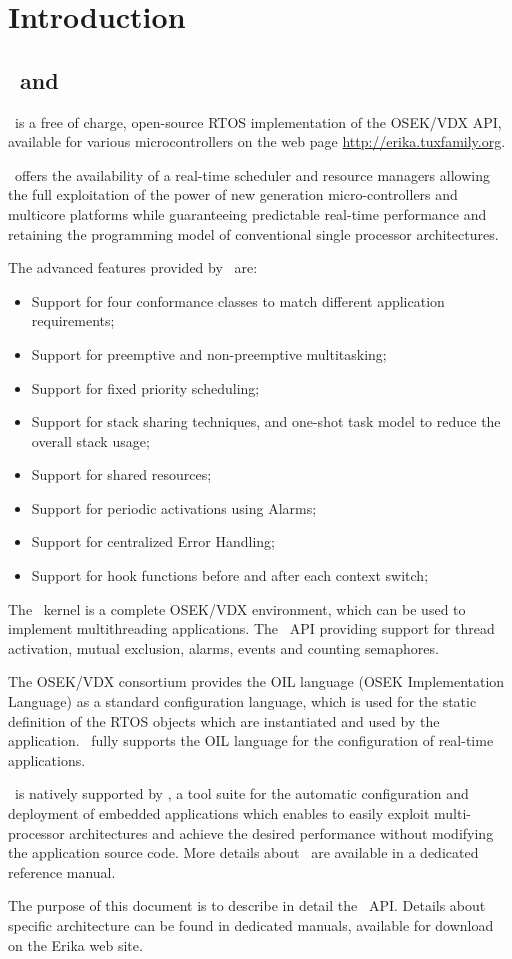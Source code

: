 \chapter{Introduction}

\section{\ee\ and \rtd}

\ee\ is a free of charge, open-source RTOS implementation of the
OSEK/VDX API, available for various microcontrollers on the web page
\url{http://erika.tuxfamily.org}.

\ee\ offers the availability of a real-time scheduler and resource 
managers allowing the full exploitation of the power of new generation 
micro-controllers and multicore platforms while guaranteeing predictable 
real-time performance and retaining the programming model of 
conventional single processor architectures.

The advanced features provided by \ee\ are:

\begin{itemize}
\item Support for four conformance classes to match different
application requirements;
\item Support for preemptive and non-preemptive multitasking;
\item Support for fixed priority scheduling;
\item Support for stack sharing techniques, and one-shot task
model to reduce the overall stack usage;
\item Support for shared resources;
\item Support for periodic activations using Alarms;
\item Support for centralized Error Handling;
\item Support for hook functions before and after each context
switch;
\end{itemize}

The \ee\ kernel is a complete OSEK/VDX environment, which can be used
to implement multithreading applications. The \ee\ API providing
support for thread activation, mutual exclusion, alarms, events and
counting semaphores.

The OSEK/VDX consortium provides the OIL language (OSEK Implementation
Language) as a standard configuration language, which is used for the
static definition of the RTOS objects which are instantiated and used
by the application. \ee\ fully supports the OIL language for the
configuration of real-time applications.

\ee\ is natively supported by \rtd, a tool suite for the automatic
configuration and deployment of embedded applications which enables to
easily exploit multi-processor architectures and achieve the desired
performance without modifying the application source code. More details
about \rtd\ are available in a dedicated reference manual.

The purpose of this document is to describe in detail the \ee\
API. Details about specific architecture can be found in dedicated manuals,
available for download on the Erika web site.



